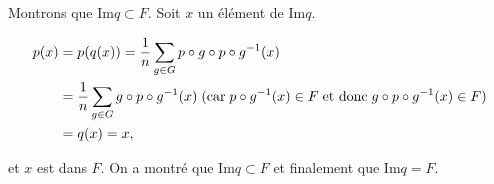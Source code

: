 {{Montrons que $\text{Im}q\subset F$. Soit $x$ un élément de $\text{Im}q$. 

\begin{align*}\ensuremath
p(x)&=p(q(x))=\frac{1}{n}\sum_{g\in G}^{}p\circ g\circ p\circ g^{-1}(x)\\
 &=\frac{1}{n}\sum_{g\in G}^{}g\circ p\circ g^{-1}(x)\;(\text{car}\;p\circ g^{-1}(x)\in F\;\text{et donc}\;g\circ p\circ g^{-1}(x)\in F)\\
 &=q(x) = x,
\end{align*}

et $x$ est dans $F$. On a montré que $\text{Im}q\subset F$ et finalement que $\text{Im}q=F$.

\begin{center}
\end{center}
}
}
